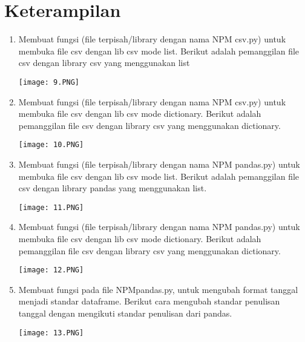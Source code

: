 \documentclass{article}
\begin{document}
\section{Keterampilan}
\begin{enumerate}
    \item Membuat fungsi (ﬁle terpisah/library dengan nama NPM csv.py) untuk membuka ﬁle csv dengan lib csv mode list. Berikut adalah pemanggilan ﬁle csv dengan library csv yang menggunakan list\\
    \begin{center}
    \texttt{[image: 9.PNG]}
    \end{center}
    
    \item Membuat fungsi (ﬁle terpisah/library dengan nama NPM csv.py) untuk membuka ﬁle csv dengan lib csv mode dictionary. Berikut adalah pemanggilan ﬁle csv dengan library csv yang menggunakan dictionary.\\
    \begin{center}
    \texttt{[image: 10.PNG]}
    \end{center}
    
    \item Membuat fungsi (ﬁle terpisah/library dengan nama NPM pandas.py) untuk membuka ﬁle csv dengan lib csv mode list. Berikut adalah pemanggilan ﬁle csv dengan library pandas yang menggunakan list.\\
    \begin{center}
    \texttt{[image: 11.PNG]}
    \end{center}
    
    \item Membuat fungsi (ﬁle terpisah/library dengan nama NPM pandas.py) untuk membuka ﬁle csv dengan lib csv mode dictionary. Berikut adalah pemanggilan ﬁle csv dengan library csv yang menggunakan dictionary.\\
    \begin{center}
    \texttt{[image: 12.PNG]}
    \end{center}
    
    \item Membuat fungsi pada ﬁle NPMpandas.py, untuk mengubah format tanggal menjadi standar dataframe. Berikut cara mengubah standar penulisan tanggal dengan mengikuti standar penulisan dari pandas.\\
    \begin{center}
    \texttt{[image: 13.PNG]}
    \end{center}
    

\end{enumerate}
\end{document}
